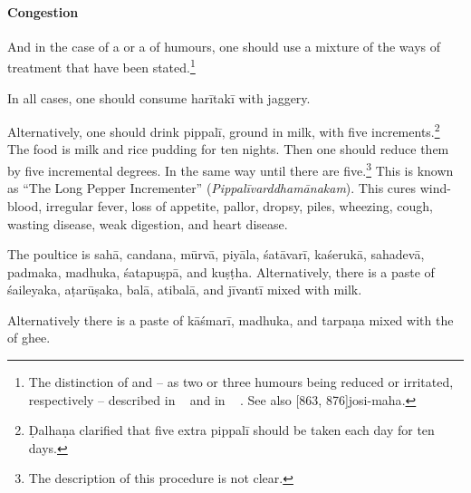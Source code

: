 \begin{translation}
    
\paragraph{Congestion}
    
\item[11] 

And in the case of a  or  a
 of humours, one should use a mixture of the
ways of treatment that have been stated.\footnote{The distinction of
     and  -- as two or
    three humours being reduced or irritated, respectively -- described in
    \CS\  and in \AH\ 
    \parencite[tr.][206]{wuja-2003}. See also [863,
    876]{josi-maha}.}

\item[12]

In all cases, one should consume \gls{harītakī} with jaggery.

Alternatively, one should drink \gls{pippalī}, ground in milk, with
five increments.\footnote{Ḍalhaṇa clarified that five extra
    \gls{pippalī} should be taken each day for ten days.} The food is milk
    and rice pudding for ten nights. Then one should reduce them by five
    incremental degrees.  In the same way until there are
    five.\footnote{The description of this procedure is not clear.} This
        is known as “The Long Pepper Incrementer”
        (\emph{Pippalīvarddhamānakam}). This cures wind-blood, irregular
        fever, loss of appetite, pallor, dropsy, piles, wheezing, cough,
        wasting disease, weak digestion, and heart disease.
        
The poultice is  \gls{sahā}, \gls{candana}, \gls{mūrvā}, \gls{piyāla},
\gls{śatāvarī}, \gls{kaśerukā}, \gls{sahadevā}, \gls{padmaka},
\gls{madhuka}, \gls{śatapuṣpā}, and \gls{kuṣṭha}. Alternatively, there
is a paste of \gls{śaileyaka}, \gls{aṭarūṣaka}, \gls{balā},
\gls{atibalā}, and \gls{jīvantī} mixed with milk.

Alternatively there is a paste of \gls{kāśmarī}, \gls{madhuka}, and \gls{tarpaṇa} mixed with the  of ghee. 


\end{translation}
